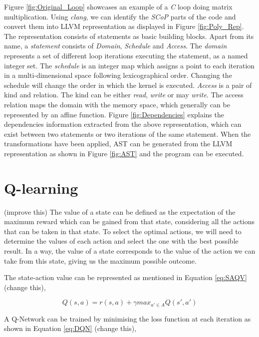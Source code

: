 \documentclass[logo,msc]{infthesis}           %
\begin{document}
 Figure \ref{fig:Original_Loop} showcases an example of a \textit{C} loop doing matrix multiplication. Using \textit{clang}, we can identify the \textit{SCoP} parts of the code and convert them into LLVM representation as displayed in Figure \ref{fig:Poly_Rep}. The representation consists of statements as basic building blocks. Apart from its name, a \textit{statement} consists of \textit{Domain}, \textit{Schedule} and \textit{Access}. The \textit{domain} represents a set of different loop iterations executing the statement, as a named integer set. The \textit{schedule} is an integer map which assigns a point to each iteration in a multi-dimensional space following lexicographical order. Changing the schedule will change the order in which the kernel is executed. \textit{Access} is a pair of kind and relation. The kind can be either \textit{read}, \textit{write} or may \textit{write}. The access relation maps the domain with the memory space, which generally can be represented by an affine function. Figure \ref{fig:Dependencies} explains the dependencies information extracted from the above representation, which can exist between two statements or two iterations of the same statement. When the transformations have been applied, AST can be generated from the LLVM representation as shown in Figure \ref{fig:AST} and the program can be executed.

 \section{Q-learning}

 (improve this) The value of a state can be defined as the expectation of the maximum reward which can be gained from that state, considering all the actions that can be taken in that state. To select the optimal actions, we will need to determine the values of each action and select the one with the best possible result. In a way, the value of a state corresponds to the value of the action we can take from this state, giving us the maximum possible outcome.

 The state-action value can be represented as mentioned in Equation \ref{eq:SAQV} (change this),

\begin{equation}
Q(s,a) = r(s,a) + {\gamma} max_{a'\in A} Q(s',a')
\label{eq:SAQV}
\end{equation}
 
 A Q-Network can be trained by minimising the loss function at each iteration as shown in Equation \ref{eq:DQN} (change this),
\end{document}

